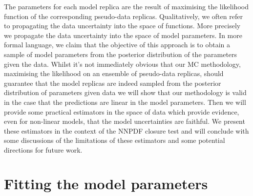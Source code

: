 The parameters for each model replica are the result of maximising the
likelihood function of the corresponding pseudo-data replicas. Qualitatively,
we often refer to propagating the data uncertainty into the space of functions.
More precisely we propagate the data uncertainty into the space of model
parameters. In more formal language, we claim that the objective of this
approach is to obtain a sample of model parameters from the posterior distribution
of the parameters given the data. Whilst it's not immediately obvious that our
MC methodology, maximising the likelihood on an ensemble of pseudo-data replicas,
should guarantee that the model replicas are indeed sampled from the posterior
distribution of parameters given data we will show that our methodology is valid
in the case that the predictions are linear in the model parameters. Then
we will provide some practical estimators in the space of data which
provide evidence, even for non-linear models, that the model uncertainties
are faithful. We present these estimators in the context of the NNPDF closure
test and will conclude with some discussions of the limitations of these estimators
and some potential directions for future work.

\section{Fitting the model parameters}

